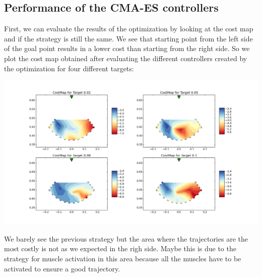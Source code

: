 \documentclass[pdftex,a4paper,11pt]{report}
\begin{document}
\subsection{Performance of the CMA-ES controllers}
First, we can evaluate the results of the optimization by looking at the cost map and if the strategy is still the same. We see that starting point from the left side of the goal point results in a lower cost than starting from the right side.
So we plot the cost map obtained after evaluating the different controllers created by the optimization for four different targets:
\begin{center}
\includegraphics[scale=0.3]{figures/costMapAll.png}
\end{center}
We barely see the previous strategy but the area where the trajectories are the most costly is not as we expected in the righ side.
Maybe this is due to the strategy for muscle activation in this area because all the muscles have to be activated to ensure a good trajectory.
\end{document}
